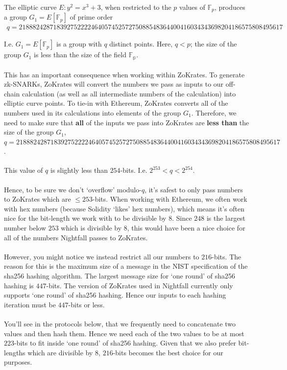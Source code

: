 The elliptic curve $E: y^2 = x^3 + 3$, when restricted to the $p$ values of $\mathbb{F}_p$, produces a group $G_1 = E[\mathbb{F}_p]$ of prime order
\begin{align*}
    q = 21888242871839275222246405745257275088548364400416034343698204186575808495617
\end{align*}

I.e. $G_1 = E[\mathbb{F}_p]$ is a group with $q$ distinct points. Here, $q < p$; the size of the group $G_1$ is less than the size of the field $\mathbb{F_p}$.\\
\\
This has an important consequence when working within ZoKrates. To generate zk-SNARKs, ZoKrates will convert the numbers we pass as inputs to our off-chain calculation (as well as all intermediate numbers of the calculation) into elliptic curve points. To tie-in with Ethereum, ZoKrates converts all of the numbers used in its calculations into elements of the group $G_1$. Therefore, we need to make sure that \textbf{all} of the inputs we pass into ZoKrates are \textbf{less than} the size of the group $G_1$, $q = 21888242871839275222246405745257275088548364400416034343698204186575808495617$.\\
\\
This value of $q$ is slightly less than $254$-bits. I.e. $2^{253} < q < 2^{254}$.\\
\\
Hence, to be sure we don't `overflow' modulo-$q$, it's safest to only pass numbers to ZoKrates which are $\leq 253$-bits. When working with Ethereum, we often work with hex numbers (because Solidity `likes' hex numbers), which means it's often nice for the bit-length we work with to be divisible by $8$. Since $248$ is the largest number below $253$ which is divisible by $8$, this would have been a nice choice for all of the numbers Nightfall passes to ZoKrates.\\
\\
However, you might notice we instead restrict all our numbers to $216$-bits. The reason for this is the maximum size of a message in the NIST specification of the sha256 hashing algorithm. The largest message size for `one round' of sha256 hashing is $447$-bits. The version of ZoKrates used in Nightfall currently only supports `one round' of sha256 hashing. Hence our inputs to each hashing iteration must be $447$-bits or less.\\
\\
You'll see in the protocols below, that we frequently need to concatenate two values and then hash them. Hence we need each of the two values to be at most $223$-bits to fit inside `one round' of sha256 hashing. Given that we also prefer bit-lengths which are divisible by $8$, $216$-bits becomes the best choice for our purposes.\\
